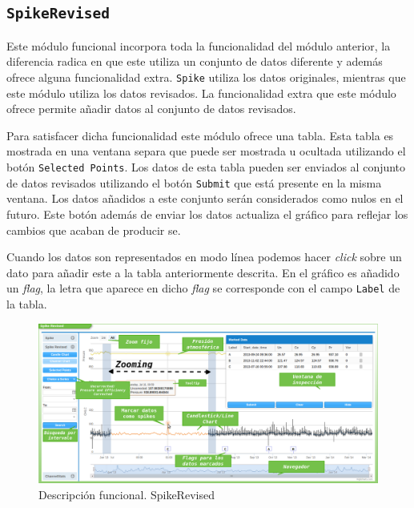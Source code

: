 	\subsection{\texttt{SpikeRevised}}
		Este módulo funcional incorpora toda la funcionalidad del módulo anterior, la diferencia radica en que este utiliza un conjunto de
		datos diferente y además ofrece alguna funcionalidad extra. \texttt{Spike} utiliza los datos originales, mientras que este módulo
		utiliza los datos revisados. La funcionalidad extra que este módulo ofrece permite añadir datos al conjunto de datos revisados.
		\par
		Para satisfacer dicha funcionalidad este módulo ofrece una tabla. Esta tabla es mostrada en una ventana separa que puede ser mostrada
		u ocultada utilizando el botón \texttt{Selected Points}. Los datos de esta tabla pueden ser enviados al conjunto de datos revisados
		utilizando el botón \texttt{Submit} que está presente en la misma ventana. Los datos añadidos a este conjunto serán considerados como
		nulos en el futuro. Este botón además de enviar los datos actualiza el gráfico para reflejar los cambios que acaban de producir se.
		\par
		Cuando los datos son representados en modo línea podemos hacer \emph{click} sobre un dato para añadir este a la tabla anteriormente
		descrita. En el gráfico es añadido un \emph{flag}, la letra que aparece en dicho \emph{flag} se corresponde con el campo
		\texttt{Label} de la tabla.
		\begin{figure}[h]
			\centering
			\includegraphics[keepaspectratio, width=1\textwidth]{./img/spikeRevised.png}
			\caption{Descripción funcional. SpikeRevised}   
			\label{fig:spikeRevised}
		\end{figure}
